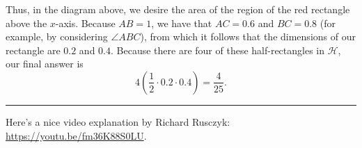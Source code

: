 \begin{solution}
Thus, in the diagram above, we desire the area of the region of the red rectangle above the $x$-axis. Because $AB=1$, we have that $AC=0.6$ and $BC=0.8$ (for example, by considering $\angle{ABC}$), from which it follows that the dimensions of our rectangle are $0.2$ and $0.4$. Because there are four of these half-rectangles in $\mathcal{H}$, our final answer is 
\[4\left(\frac{1}{2}\cdot 0.2\cdot 0.4\right)=\frac{4}{25}.\]
\vspace{0.3cm} \rule{\textwidth}{0.3pt}

Here's a nice video explanation by Richard Rusczyk: \url{https://youtu.be/fm36K88S0LU}.
\end{solution}
